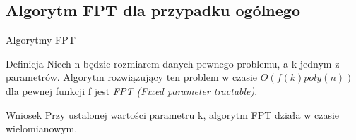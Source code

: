 \documentclass{beamer}
\begin{document}
	\subsection{Algorytm FPT dla przypadku ogólnego}
		\begin{frame}{Algorytmy FPT}
			\begin{block}{Definicja}			
				Niech n będzie rozmiarem danych pewnego problemu, a k jednym z parametrów. Algorytm rozwiązujący ten problem w czasie $ O(f(k)poly(n)) $ dla pewnej funkcji f jest \emph{FPT (Fixed parameter tractable)}.
			\end{block}
			
			\pause
			\begin{exampleblock}{Wniosek}			
				Przy ustalonej wartości parametru k, algorytm FPT działa w czasie wielomianowym.
			\end{exampleblock}
		\end{frame}
\end{document}
